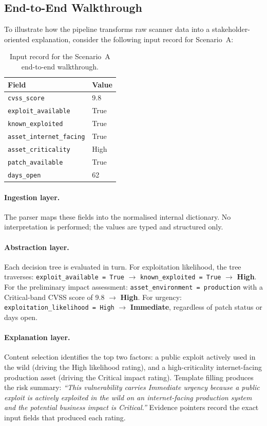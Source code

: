 \subsection{End-to-End Walkthrough}
\label{subsec:walkthrough}

To illustrate how the pipeline transforms raw scanner data into a 
stakeholder-oriented explanation, consider the following input record 
for Scenario~A:

\begin{table}[h]
\centering
\begin{tabular}{@{}ll@{}}
\toprule
\textbf{Field} & \textbf{Value} \\
\midrule
\texttt{cvss\_score}             & 9.8 \\
\texttt{exploit\_available}      & True \\
\texttt{known\_exploited}        & True \\
\texttt{asset\_internet\_facing} & True \\
\texttt{asset\_criticality}      & High \\
\texttt{patch\_available}        & True \\
\texttt{days\_open}              & 62 \\
\bottomrule
\end{tabular}
\caption{Input record for the Scenario~A end-to-end walkthrough.}
\label{tab:walkthrough-input}
\end{table}

\paragraph{Ingestion layer.} The parser maps these fields into the 
normalised internal dictionary. No interpretation is performed; 
the values are typed and structured only.

\paragraph{Abstraction layer.} Each decision tree is evaluated in 
turn. For exploitation likelihood, the tree traverses: 
\texttt{exploit\_available = True} $\to$ \texttt{known\_exploited 
= True} $\to$ \textbf{High}. For the preliminary impact assessment: 
\texttt{asset\_environment = production} with a Critical-band 
\ac{CVSS} score of 9.8 $\to$ \textbf{High}.
For urgency: \texttt{exploitation\_likelihood = High} $\to$ 
\textbf{Immediate}, regardless of patch status or days open.

\paragraph{Explanation layer.} Content selection identifies the top 
two factors: a public exploit actively used in the wild (driving 
the High likelihood rating), and a high-criticality internet-facing 
production asset (driving the Critical impact rating). Template 
filling produces the risk summary: \textit{``This vulnerability 
carries Immediate urgency because a public exploit is actively 
exploited in the wild on an internet-facing production system and 
the potential business impact is Critical.''} Evidence pointers 
record the exact input fields that produced each rating.

